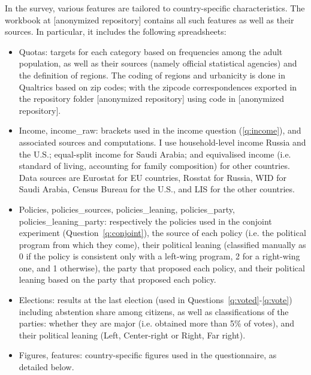 \documentclass[12pt,english]{article}
\begin{document}
\begin{bibunit}
In the survey, various features are tailored to country-specific characteristics. 
The workbook at [anonymized repository] contains all such features as well as their sources. %
In particular, it includes the following spreadsheets:
\begin{itemize}
    \item Quotas: targets for each category based on frequencies among the adult population, as well as their sources (namely official statistical agencies) and the definition of regions. The coding of regions and urbanicity is done in Qualtrics based on zip codes; with the zipcode correspondences exported in the repository folder [anonymized repository] using code in [anonymized repository]. %
    \item Income, income\_raw: brackets used in the income question (\ref{q:income}), and associated sources and computations. I use household-level income Russia and the U.S.; equal-split income for Saudi Arabia; and equivalised income (i.e. standard of living, accounting for family composition) for other countries. Data sources are Eurostat for EU countries, Rosstat for Russia, WID for Saudi Arabia, Census Bureau for the U.S., and LIS for the other countries. 
    \item Policies, policies\_sources, policies\_leaning, policies\_party, policies\_leaning\_party: respectively the policies used in the conjoint experiment (Question~\ref{q:conjoint}), the source of each policy (i.e. the political program from which they come), their political leaning (classified manually as 0 if the policy is consistent only with a left-wing program, 2 for a right-wing one, and 1 otherwise), the party that proposed each policy, and their political leaning based on the party that proposed each policy.
    \item Elections: results at the last election (used in Questions~\ref{q:voted}-\ref{q:vote}) including abstention share among citizens, as well as classifications of the parties: whether they are major (i.e. obtained more than 5\% of votes), and their political leaning (Left, Center-right or Right, Far right). 
    \item Figures, features: country-specific figures used in the questionnaire, as detailed below.
\end{itemize}



\end{bibunit}
\end{document}
